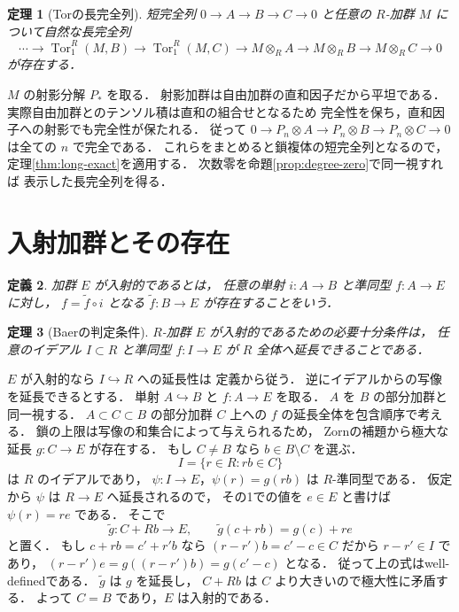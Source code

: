 \documentclass[a5paper,10pt,onecolumn]{jsarticle}
\makeatletter
\theoremstyle{mathnotetheorem}
\newtheorem{theorem}{定理}[section]
\newtheorem{definition}[theorem]{定義}
\renewcommand{\proofname}{証明}
\renewenvironment{proof}[1][\proofname]{%
  \par\pushQED{\qed}\normalfont\topsep4\p@\@plus2\p@\relax
  \trivlist\item[\hskip\labelsep\bfseries #1]\ignorespaces
}{\popQED\endtrivlist\@endpefalse}
\makeatother
\begin{document}
\begin{theorem}[Torの長完全列]\label{thm:tor-long}
短完全列 $0\to A\to B\to C\to0$ と任意の $R$-加群 $M$
について自然な長完全列
\[
 \cdots\to\operatorname{Tor}_1^R(M,B)
 \to\operatorname{Tor}_1^R(M,C)\to M\otimes_R A
 \to M\otimes_R B\to M\otimes_R C\to0
\]
が存在する．
\end{theorem}
\begin{proof}
$M$ の射影分解 $P_*$ を取る．
射影加群は自由加群の直和因子だから平坦である．
実際自由加群とのテンソル積は直和の組合せとなるため
完全性を保ち，直和因子への射影でも完全性が保たれる．
従って
$0\to P_n\otimes A\to P_n\otimes B\to
P_n\otimes C\to0$ は全ての $n$ で完全である．
これらをまとめると鎖複体の短完全列となるので，
定理\ref{thm:long-exact}を適用する．
次数零を命題\ref{prop:degree-zero}で同一視すれば
表示した長完全列を得る．
\end{proof}

\section{入射加群とその存在}

\begin{definition}
加群 $E$ が入射的であるとは，
任意の単射 $i:A\to B$ と準同型 $f:A\to E$ に対し，
$f=\widetilde f\circ i$ となる
$\widetilde f:B\to E$ が存在することをいう．
\end{definition}

\begin{theorem}[Baerの判定条件]\label{thm:baer}
$R$-加群 $E$ が入射的であるための必要十分条件は，
任意のイデアル $I\subset R$ と準同型 $f:I\to E$ が
$R$ 全体へ延長できることである．
\end{theorem}
\begin{proof}
$E$ が入射的なら $I\hookrightarrow R$ への延長性は
定義から従う．
逆にイデアルからの写像を延長できるとする．
単射 $A\hookrightarrow B$ と $f:A\to E$ を取る．
$A$ を $B$ の部分加群と同一視する．
$A\subset C\subset B$ の部分加群 $C$ 上への
$f$ の延長全体を包含順序で考える．
鎖の上限は写像の和集合によって与えられるため，
Zornの補題から極大な延長 $g:C\to E$ が存在する．
もし $C\ne B$ なら $b\in B\setminus C$ を選ぶ．
\[
 I=\{r\in R:rb\in C\}
\]
は $R$ のイデアルであり，
$\psi:I\to E$，$\psi(r)=g(rb)$ は $R$-準同型である．
仮定から $\psi$ は $R\to E$ へ延長されるので，
その1での値を $e\in E$ と書けば
$\psi(r)=re$ である．
そこで
\[
 \widetilde g:C+Rb\to E,\qquad
 \widetilde g(c+rb)=g(c)+re
\]
と置く．
もし $c+rb=c'+r'b$ なら
$(r-r')b=c'-c\in C$ だから
$r-r'\in I$ であり，
$(r-r')e=g((r-r')b)=g(c'-c)$ となる．
従って上の式はwell-definedである．
$\widetilde g$ は $g$ を延長し，
$C+Rb$ は $C$ より大きいので極大性に矛盾する．
よって $C=B$ であり，$E$ は入射的である．
\end{proof}
\end{document}

